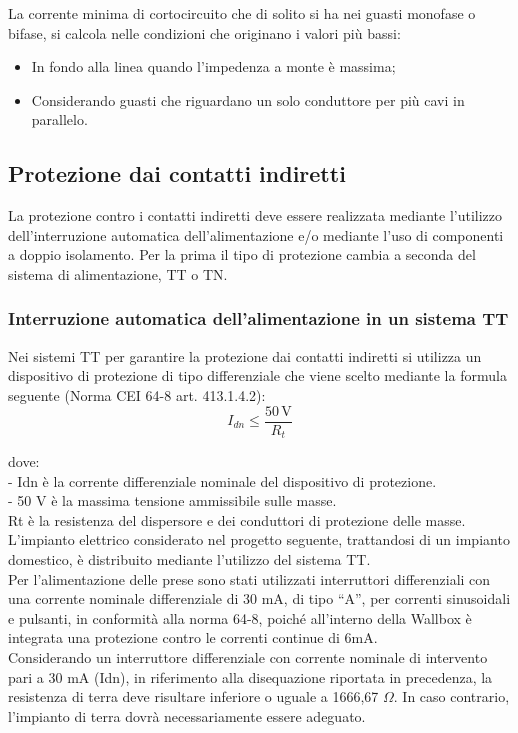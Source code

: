 La corrente minima di cortocircuito che di solito si ha nei guasti monofase o bifase, si calcola nelle condizioni che originano i valori più bassi:
\begin{itemize}
    \item In fondo alla linea quando l’impedenza a monte è massima;
    \item Considerando guasti che riguardano un solo conduttore per più cavi in parallelo.
\end{itemize}


\subsection{Protezione dai contatti indiretti}
La protezione contro i contatti indiretti deve essere realizzata mediante l’utilizzo dell’interruzione automatica dell’alimentazione e/o mediante l’uso di componenti a doppio isolamento. Per la prima il tipo di protezione cambia a seconda del sistema di alimentazione, TT o TN. 

\subsubsection{Interruzione automatica dell’alimentazione in un sistema TT}
Nei sistemi TT per garantire la protezione dai contatti indiretti si utilizza un dispositivo di protezione di tipo differenziale che viene scelto mediante la formula seguente (Norma CEI 64-8 art. 413.1.4.2):
\[ I_{dn} \leq \frac{50\,\text{V}}{R_t} \]

dove:  \\
- Idn è la corrente differenziale nominale del dispositivo di protezione. \\
- 50 V è la massima tensione ammissibile sulle masse. \\

Rt è la resistenza del dispersore e dei conduttori di protezione delle masse.
L’impianto elettrico considerato nel progetto seguente, trattandosi di un impianto domestico, è distribuito mediante l’utilizzo del sistema TT. \\
Per l’alimentazione delle prese sono stati utilizzati interruttori differenziali con una corrente nominale differenziale di 30 mA, di tipo “A”, per correnti sinusoidali e pulsanti, in conformità alla norma 64-8, poiché all'interno della Wallbox è integrata una protezione contro le correnti continue di 6mA. \\
Considerando un interruttore differenziale con corrente nominale di intervento pari a 30 mA (Idn), in riferimento alla disequazione riportata in precedenza, la resistenza di terra deve risultare inferiore o uguale a 1666,67 $\Omega$. In caso contrario, l’impianto di terra dovrà necessariamente essere adeguato.

